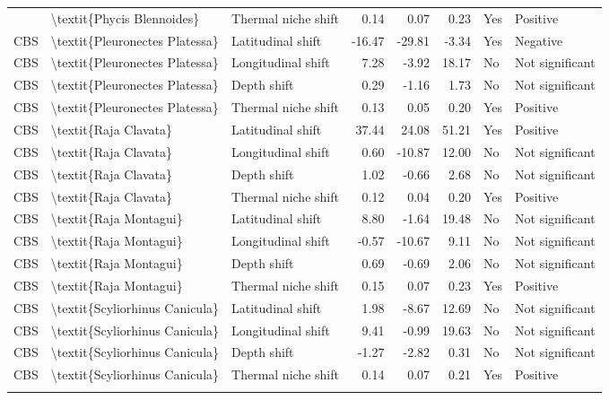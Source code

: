 \begin{longtable}[t]{lllrrrll}
{{CBS & \textbackslash{}textit\{Phycis Blennoides\} & Thermal niche shift & 0.14 & 0.07 & 0.23 & Yes & Positive\\
CBS & \textbackslash{}textit\{Pleuronectes Platessa\} & Latitudinal shift & -16.47 & -29.81 & -3.34 & Yes & Negative\\
\addlinespace
CBS & \textbackslash{}textit\{Pleuronectes Platessa\} & Longitudinal shift & 7.28 & -3.92 & 18.17 & No & Not significant\\
CBS & \textbackslash{}textit\{Pleuronectes Platessa\} & Depth shift & 0.29 & -1.16 & 1.73 & No & Not significant\\
CBS & \textbackslash{}textit\{Pleuronectes Platessa\} & Thermal niche shift & 0.13 & 0.05 & 0.20 & Yes & Positive\\
CBS & \textbackslash{}textit\{Raja Clavata\} & Latitudinal shift & 37.44 & 24.08 & 51.21 & Yes & Positive\\
CBS & \textbackslash{}textit\{Raja Clavata\} & Longitudinal shift & 0.60 & -10.87 & 12.00 & No & Not significant\\
\addlinespace
CBS & \textbackslash{}textit\{Raja Clavata\} & Depth shift & 1.02 & -0.66 & 2.68 & No & Not significant\\
CBS & \textbackslash{}textit\{Raja Clavata\} & Thermal niche shift & 0.12 & 0.04 & 0.20 & Yes & Positive\\
CBS & \textbackslash{}textit\{Raja Montagui\} & Latitudinal shift & 8.80 & -1.64 & 19.48 & No & Not significant\\
CBS & \textbackslash{}textit\{Raja Montagui\} & Longitudinal shift & -0.57 & -10.67 & 9.11 & No & Not significant\\
CBS & \textbackslash{}textit\{Raja Montagui\} & Depth shift & 0.69 & -0.69 & 2.06 & No & Not significant\\
\addlinespace
CBS & \textbackslash{}textit\{Raja Montagui\} & Thermal niche shift & 0.15 & 0.07 & 0.23 & Yes & Positive\\
CBS & \textbackslash{}textit\{Scyliorhinus Canicula\} & Latitudinal shift & 1.98 & -8.67 & 12.69 & No & Not significant\\
CBS & \textbackslash{}textit\{Scyliorhinus Canicula\} & Longitudinal shift & 9.41 & -0.99 & 19.63 & No & Not significant\\
CBS & \textbackslash{}textit\{Scyliorhinus Canicula\} & Depth shift & -1.27 & -2.82 & 0.31 & No & Not significant\\
CBS & \textbackslash{}textit\{Scyliorhinus Canicula\} & Thermal niche shift & 0.14 & 0.07 & 0.21 & Yes & Positive\\
}}
\end{longtable}
